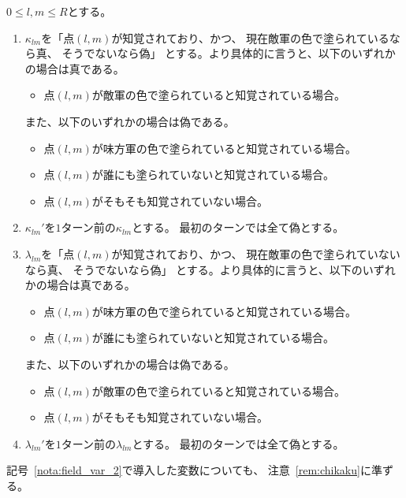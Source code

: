 \begin{nota}[隠伏・顕現のためのフィールドからの制約変数] \label{nota:field_var_2}
 $0 \leq l, m \leq R$とする。
 \begin{enumerate}[1.]
  \item $\kappa_{lm}$を「点$(l, m)$が知覚されており、かつ、
        現在敵軍の色で塗られているなら真、
        そうでないなら偽」
        とする。より具体的に言うと、以下のいずれかの場合は真である。
        \begin{itemize}
         \item 点$(l, m)$が敵軍の色で塗られていると知覚されている場合。
        \end{itemize}
        また、以下のいずれかの場合は偽である。
        \begin{itemize}
         \item 点$(l, m)$が味方軍の色で塗られていると知覚されている場合。
         \item 点$(l, m)$が誰にも塗られていないと知覚されている場合。
         \item 点$(l, m)$がそもそも知覚されていない場合。
        \end{itemize}
  \item $\kappa_{lm}'$を$1$ターン前の$\kappa_{lm}$とする。
        最初のターンでは全て偽とする。
  \item $\lambda_{lm}$を「点$(l, m)$が知覚されており、かつ、
        現在敵軍の色で塗られていないなら真、
        そうでないなら偽」
        とする。より具体的に言うと、以下のいずれかの場合は真である。
        \begin{itemize}
         \item 点$(l, m)$が味方軍の色で塗られていると知覚されている場合。
         \item 点$(l, m)$が誰にも塗られていないと知覚されている場合。
        \end{itemize}
        また、以下のいずれかの場合は偽である。
        \begin{itemize}
         \item 点$(l, m)$が敵軍の色で塗られていると知覚されている場合。
         \item 点$(l, m)$がそもそも知覚されていない場合。
        \end{itemize}
  \item $\lambda_{lm}'$を$1$ターン前の$\lambda_{lm}$とする。
        最初のターンでは全て偽とする。
 \end{enumerate}
\end{nota}

記号~\ref{nota:field_var_2}で導入した変数についても、
注意~\ref{rem:chikaku}に準ずる。

